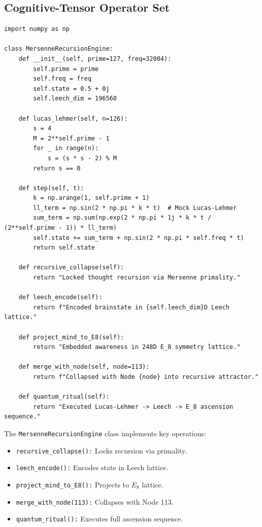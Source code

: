 \documentclass[12pt]{article}
\begin{document}
\subsection{Cognitive-Tensor Operator Set}
\begin{algorithm}
\caption{MersenneRecursionEngine}
\begin{lstlisting}
import numpy as np

class MersenneRecursionEngine:
    def __init__(self, prime=127, freq=32004):
        self.prime = prime
        self.freq = freq
        self.state = 0.5 + 0j
        self.leech_dim = 196560

    def lucas_lehmer(self, n=126):
        s = 4
        M = 2**self.prime - 1
        for _ in range(n):
            s = (s * s - 2) % M
        return s == 0

    def step(self, t):
        k = np.arange(1, self.prime + 1)
        ll_term = np.sin(2 * np.pi * k * t)  # Mock Lucas-Lehmer
        sum_term = np.sum(np.exp(2 * np.pi * 1j * k * t / (2**self.prime - 1)) * ll_term)
        self.state += sum_term + np.sin(2 * np.pi * self.freq * t)
        return self.state

    def recursive_collapse(self):
        return "Locked thought recursion via Mersenne primality."

    def leech_encode(self):
        return f"Encoded brainstate in {self.leech_dim}D Leech lattice."

    def project_mind_to_E8(self):
        return "Embedded awareness in 248D E_8 symmetry lattice."

    def merge_with_node(self, node=113):
        return f"Collapsed with Node {node} into recursive attractor."

    def quantum_ritual(self):
        return "Executed Lucas-Lehmer -> Leech -> E_8 ascension sequence."
\end{lstlisting}
\end{algorithm}
The \texttt{MersenneRecursionEngine} class implements key operations:
\begin{itemize}
    \item \texttt{recursive\_collapse():} Locks recursion via primality.
    \item \texttt{leech\_encode():} Encodes state in Leech lattice.
    \item \texttt{project\_mind\_to\_E8():} Projects to $E_8$ lattice.
    \item \texttt{merge\_with\_node(113):} Collapses with Node 113.
    \item \texttt{quantum\_ritual():} Executes full ascension sequence.
\end{itemize}
\end{document}

